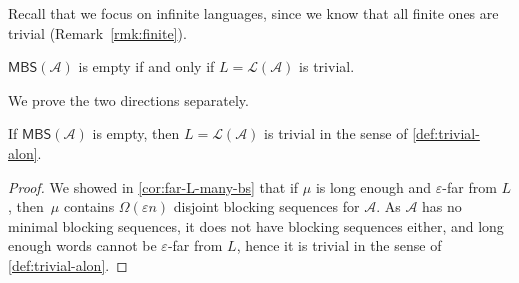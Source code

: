 \documentclass[letterpaper, USenglish, cleveref, autoref, thm-restate, numberwithinsect]{lipics-v2021}
\theoremstyle{theorem}
\theoremstyle{definition}
\newcommand{\Aa}{\mathcal{A}}
\newcommand{\eps}{\varepsilon}
\newcommand{\lang}[1]{\mathcal{L}(#1)}
\newcommand{\MBS}{\textsf{MBS}\xspace}
\begin{document}
Recall that we focus on infinite languages, since we know that all finite ones are trivial (Remark~\ref{rmk:finite}). 
\begin{lemma}\label{lem:trivialiffMBSempty}
	$\MBS(\Aa)$ is empty if and only if $L = \lang{\Aa}$ is trivial.
\end{lemma}

We prove the two directions separately.
\begin{lemma}
	If $\MBS(\Aa)$ is empty, then $L = \lang{\Aa}$ is trivial in the sense of \cref{def:trivial-alon}.
\end{lemma}
\begin{proof}
	We showed in \cref{cor:far-L-many-bs} that if $\mu$ is long enough and $\eps$-far from $L$,
	then~$\mu$ contains $\Omega(\eps n)$ disjoint blocking sequences for $\Aa$.
	As $\Aa$ has no minimal blocking sequences, it does not have blocking sequences either, and long enough words cannot be $\eps$-far from $L$, hence it is trivial in the sense of \cref{def:trivial-alon}.
\end{proof}
\end{document}
